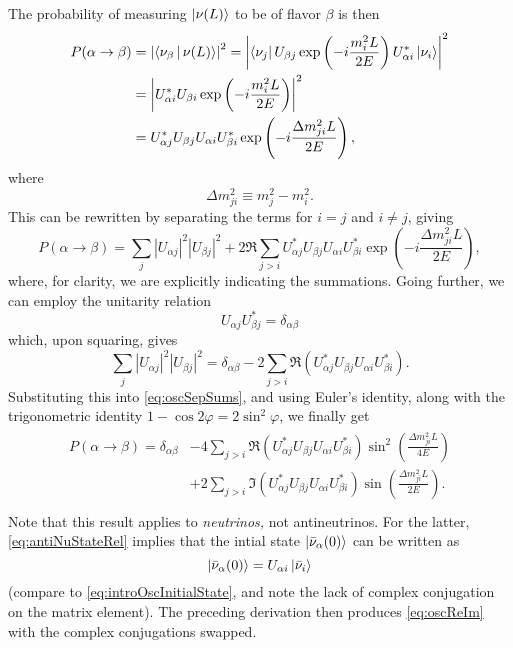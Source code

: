 \documentclass[../thesis.tex]{subfiles}
\begin{document}
The probability of measuring $\ket{\nu(L)}$ to be of flavor $\beta$ is then
\begin{align*}
  P(\alpha \rightarrow \beta)
  &= \left|\Braket{\nu_\beta|\nu(L)}\right|^2
    = \left| \Bra{\nu_j} U_{\beta j} \exp\left( -i\frac{m_i^2L}{2E} \right) U^*_{\alpha i}\Ket{\nu_i}\right|^2 \\
  &=  \left| U^*_{\alpha i} U_{\beta i} \exp\left( -i \frac{m_i^2L}{2E} \right)\right|^2 \\
  &= U^*_{\alpha j} U_{\beta j} U_{\alpha i} U^*_{\beta i} \exp\left( -i \frac{\Delta m^2_{ji}L}{2E} \right),
\end{align*}
where
\begin{equation}
  \Delta m^2_{ji} \equiv m^2_j - m^2_i.
\end{equation}
This can be rewritten by separating the terms for \(i = j\) and \(i \neq j\), giving
\begin{equation}
  \label{eq:oscSepSums}
  P(\alpha \rightarrow \beta) = \sum_{j} |U_{\alpha j}|^2 |U_{\beta j}|^2
  + 2 \Re \sum_{j>i} U^*_{\alpha j} U_{\beta j} U_{\alpha i} U^*_{\beta i}
  \exp\left( -i \frac{\Delta m^2_{ji}L}{2E} \right),
\end{equation}
where, for clarity, we are explicitly indicating the summations. Going further, we can employ the unitarity relation
\begin{equation}
  U_{\alpha j} U^*_{\beta j} = \delta_{\alpha \beta}
\end{equation}
which, upon squaring, gives
\begin{equation}
  \sum_j |U_{\alpha j}|^2 |U_{\beta j}|^2 = \delta_{\alpha \beta}
  - 2 \sum_{j > i} \Re(U^*_{\alpha j} U_{\beta j} U_{\alpha i} U^*_{\beta i}).
\end{equation}
Substituting this into \eqref{eq:oscSepSums}, and using Euler's identity, along with the trigonometric identity \(1 - \cos 2\varphi = 2\sin^2 \varphi\), we finally get
\begin{align}
  \label{eq:oscReIm}
  \begin{split}
    P(\alpha \rightarrow \beta) = \delta_{\alpha \beta} &- 4\sum_{j > i} \Re(U^*_{\alpha j} U_{\beta j} U_{\alpha i} U^*_{\beta i})
    \sin^2 \left( \frac{\Delta m^2_{ji}L}{4E} \right) \\
    &+ 2\sum_{j > i} \Im(U^*_{\alpha j} U_{\beta j} U_{\alpha i} U^*_{\beta i})
    \sin \left( \frac{\Delta m^2_{ji}L}{2E} \right). \\
  \end{split}
\end{align}
Note that this result applies to \emph{neutrinos,} not antineutrinos. For the latter, \autoref{eq:antiNuStateRel} implies that the intial state $\ket{\bar\nu_\alpha(0)}$ can be written as 
\begin{equation}
  \ket{\bar\nu_\alpha(0)} = U_{\alpha i}\ket{\bar\nu_i}
\end{equation}
(compare to \autoref{eq:introOscInitialState}, and note the lack of complex conjugation on the matrix element). The preceding derivation then produces \eqref{eq:oscReIm} with the complex conjugations swapped.
\end{document}
